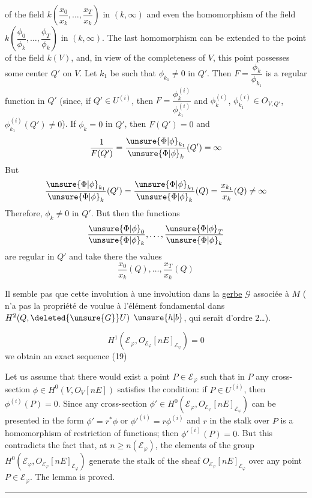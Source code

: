 of the field $k(\dfrac{x_0}{x_k},\ldots,\dfrac{x_T}{x_k})$ in $(k,\infty)$ and even the homomorphism of the field $k(\dfrac{\phi_0}{\phi_k},\ldots,\dfrac{\phi_T}{\phi_k})$ in $(k,\infty)$. The last homomorphism can be extended to the point of the field $k(V)$, and, in view of the completeness of $V$, this point possesses some center $Q'$ on $V$. Let $k_1$ be such that $\phi_{k_1}\ne0$ in $Q'$. Then $F=\dfrac{\phi_k}{\phi_{k_1}}$ is a regular function in $Q'$ (since, if $Q'\in U^{(i)}$, then $F=\dfrac{\phi_k^{(i)}}{\phi_{k_1}^{(i)}}$ and $\phi_k^{(i)}$, $\phi_{k_1}^{(i)}\in O_{V,Q'}$, $\phi_{k_1}^{(i)}(Q')\ne0$). If $\phi_k=0$ in $Q'$, then $F(Q')=0$ and
\[
\frac{1}{F(Q')}=\frac{\unsure{\Phi|\phi}_{k_1}}{\unsure{\Phi|\phi}_k}(Q')=\infty
\]
But
\[
\frac{\unsure{\Phi|\phi}_{k_1}}{\unsure{\Phi|\phi}_k}(Q')=\frac{\unsure{\Phi|\phi}_{k_1}}{\unsure{\Phi|\phi}_k}(Q)=\frac{x_{k_1}}{x_k}(Q)\ne\infty
\]
Therefore, $\phi_k\ne0$ in $Q'$. But then the functions
\[
\frac{\unsure{\Phi|\phi}_0}{\unsure{\Phi|\phi}_k},\ldots,\frac{\unsure{\Phi|\phi}_T}{\unsure{\Phi|\phi}_k}
\]
are regular in $Q'$ and take there the values
\[
\frac{x_0}{x_k}(Q),\ldots,\frac{x_T}{x_k}(Q)
\]

Il  semble pas que cette involution  à une involution dans la \uline{gerbe} $\mathscr G$ associée à $M$ (   n'a pas la propriété de  voulue  à l'élément fondamental  dans $H^2(Q,\deleted{\unsure{G}}U)$ $\unsure{h|b}$, qui serait  d'ordre  $2$\ldots).

\[
H^1(\mathcal E_\varphi,O_{\mathcal E_\varphi}[nE]_{\mathcal E_\varphi})=0
\]
we obtain an exact sequence
\hfill(19)

Let us assume that there would exist a point $P\in\mathcal E_\varphi$ such that in $P$ any cross-section $\phi\in H^0(V,O_V[nE])$ satisfies the condition: if $P\in U^{(i)}$, then $\phi^{(i)}(P)=0$. Since any cross-section $\phi'\in H^0(\mathcal E_\varphi,O_{\mathcal E_\varphi}[nE]_{\mathcal E_\varphi})$ can be presented in the form $\phi'=r^*\phi$ or $\phi'^{(i)}=r\phi^{(i)}$ and $r$ in the stalk over $P$ is a homomorphism of restriction of functions; then $\phi'^{(i)}(P)=0$. But this contradicts the fact that, at $n\ge n(\mathcal E_\varphi)$, the elements of the group $H^0(\mathcal E_\varphi,O_{\mathcal E_\varphi}[nE]_{\mathcal E_\varphi})$ generate the stalk of the sheaf $O_{\mathcal E_\varphi}[nE]_{\mathcal E_\varphi}$ over any point $P\in\mathcal E_\varphi$. The lemma is proved.\ \rule{0.5em}{1em}

